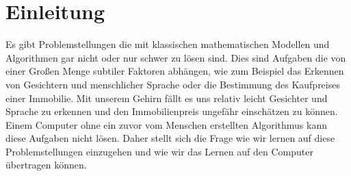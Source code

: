

\section{Einleitung}



Es gibt Problemstellungen die mit klassischen mathematischen Modellen und Algorithmen gar nicht oder nur schwer zu lösen sind. Dies sind Aufgaben die von einer Großen Menge subtiler Faktoren abhängen, wie zum Beispiel das Erkennen von Gesichtern und menschlicher Sprache oder die Bestimmung des Kaufpreises einer Immobilie. Mit unserem Gehirn fällt es uns relativ leicht Gesichter und Sprache zu erkennen und den Immobilienpreis ungefähr einschätzen zu können. Einem Computer ohne ein zuvor vom Menschen erstellten Algorithmus kann diese Aufgaben nicht lösen. Daher stellt sich die Frage wie wir lernen auf diese Problemstellungen einzugehen und wie wir das Lernen auf den Computer übertragen können.

\blankpage
\blankpage


